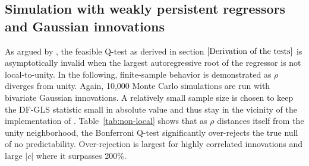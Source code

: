 \documentclass{article}
\begin{document}
\subsection{Simulation with weakly persistent regressors and Gaussian innovations}
\label{Simulation with weakly persistent regressors and Gaussian innovations}
As argued by \citet{phillips2014confidence}, the feasible Q-test as derived in section $\ref{Derivation of the tests}$ is asymptotically invalid when the largest autoregressive root of the regressor is not local-to-unity. In the following, finite-sample behavior is demonstrated as $\rho$ diverges from unity. Again, 10,000 Monte Carlo simulations are run with bivariate Gaussian innovations. A relatively small sample size is chosen to keep the DF-GLS statistic small in absolute value and thus stay in the vicinity of the implementation of \citet{campbell2005implementing}. Table~\vref{tab:non-local} shows that as $\rho$ distances itself from the unity neighborhood, the Bonferroni Q-test significantly over-rejects the true null of no predictability. Over-rejection is largest for highly correlated innovations and large $|c|$ where it surpasses 200\%.
\end{document}
